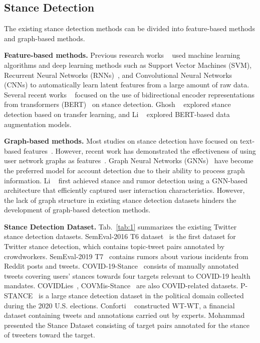 \documentclass[10pt,twocolumn,letterpaper]{article}
\begin{document}
\subsection{Stance Detection}
The existing stance detection methods can be divided into feature-based methods and graph-based methods.

\noindent
\textbf{Feature-based methods.}
Previous research works ~\cite{Alpher13,Alpher14,Alpher15} used machine learning algorithms and deep learning methods such as Support Vector Machines (SVM), Recurrent Neural Networks (RNNs)~\cite{Alpher13}, and Convolutional Neural Networks (CNNs) to automatically learn latent features from a large amount of raw data. Several recent works ~\cite{Alpher16,Alpher17,Alpher18,Alpher27,Alpher28} focused on the use of bidirectional encoder representations from transformers (BERT)~\cite{Alpher02} on stance detection. Ghosh \etal~\cite{Alpher19} explored stance detection based on transfer learning, and Li \etal~\cite{Alpher16} explored BERT-based data augmentation models.

\noindent
\textbf{Graph-based methods.}
Most studies on stance detection have focused on text-based features~\cite{Alpher13,Alpher21,Alpher28}. However, recent work has demonstrated the effectiveness of using user network graphs as features~\cite{Alpher09,Alpher23}. Graph Neural Networks (GNNs)~\cite{Alpher20,Alpher42} have become the preferred model for account detection due to their ability to process graph information. Li \etal~\cite{Alpher24} first achieved stance and rumor detection using a GNN-based architecture that efficiently captured user interaction characteristics. However, the lack of graph structure in existing stance detection datasets hinders the development of graph-based detection methods.

\noindent
\textbf{Stance Detection Dataset.}
Tab.~\ref{tab:1} summarizes the existing Twitter stance detection datasets. SemEval-2016 T6 dataset~\cite{Alpher21} is the first dataset for Twitter stance detection, which contains topic-tweet pairs annotated by crowdworkers. SemEval-2019 T7~\cite{Alpher25} contains rumors about various incidents from Reddit posts and tweets. COVID-19-Stance~\cite{Alpher31} consists of manually annotated tweets covering users’ stances towards four targets relevant to COVID-19 health mandates. COVIDLies~\cite{Alpher26}, COVMis-Stance~\cite{Alpher27} are also COVID-related datasets. P-STANCE~\cite{Alpher28} is a large stance detection dataset in the political domain collected during the 2020 U.S. elections. Conforti \etal~\cite{Alpher29} constructed WT-WT, a financial dataset containing tweets and annotations carried out by experts. Mohammad \etal~\cite{Alpher01} presented the Stance Dataset consisting of target pairs annotated for the stance of tweeters toward the target.
\end{document}
